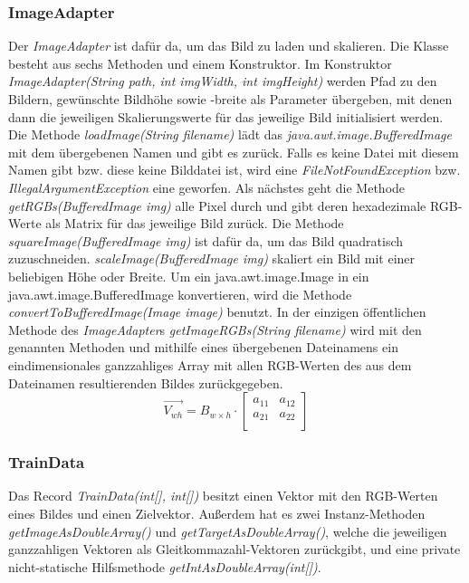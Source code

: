 \documentclass[paper=A4,pagesize=auto,12pt,headinclude=true,footinclude=true,BCOR=0mm,DIV=calc]{scrartcl}
\begin{document}
\subsubsection{ImageAdapter} %
Der \textit{ImageAdapter} ist dafür da, um das Bild zu laden und skalieren.
Die Klasse besteht aus sechs Methoden und einem Konstruktor. 
Im Konstruktor \textit{ImageAdapter(String path, int imgWidth, int imgHeight)} werden Pfad zu den Bildern, gewünschte Bildhöhe sowie -breite als Parameter übergeben, mit denen dann die jeweiligen Skalierungswerte für das jeweilige Bild initialisiert werden.
Die Methode \textit{loadImage(String filename)} lädt das \textit{java.awt.image.BufferedImage} mit dem übergebenen Namen und gibt es zurück.
Falls es keine Datei mit diesem Namen gibt bzw. diese keine Bilddatei ist, wird eine \textit{FileNotFoundException} bzw. \textit{IllegalArgumentException} eine geworfen.
Als nächstes geht die Methode \textit{getRGBs(BufferedImage img)} alle Pixel durch und gibt deren hexadezimale RGB-Werte als Matrix für das jeweilige Bild zurück.
Die Methode \textit{squareImage(BufferedImage img)} ist dafür da, um das Bild quadratisch zuzuschneiden. 
\textit{scaleImage(BufferedImage img)} skaliert ein Bild mit einer beliebigen Höhe oder Breite.
Um ein java.awt.image.Image in ein java.awt.image.BufferedImage konvertieren, wird die Methode \textit{convertToBufferedImage(Image image)} benutzt.
In der einzigen öffentlichen Methode des \textit{ImageAdapter}s \textit{getImageRGBs(String filename)} wird mit den genannten Methoden und mithilfe eines übergebenen Dateinamens ein eindimensionales ganzzahliges Array mit allen RGB-Werten des aus dem Dateinamen resultierenden Bildes zurückgegeben.
\[
\vec{V_{wh}} = B_{w\times h} \cdot
\left[ {\begin{array}{cc}
		a_{11} & a_{12} \\
		a_{21} & a_{22} \\
\end{array} } \right]
\]

\subsubsection{TrainData}
Das Record \textit{TrainData(int[], int[])} besitzt einen Vektor mit den RGB-Werten eines Bildes und einen Zielvektor. Außerdem hat es zwei Instanz-Methoden \textit{getImageAsDoubleArray()} und \textit{getTargetAsDoubleArray()}, welche die jeweiligen ganzzahligen Vektoren als Gleitkommazahl-Vektoren zurückgibt, und eine private nicht-statische Hilfsmethode \textit{getIntAsDoubleArray(int[])}.
\end{document}
